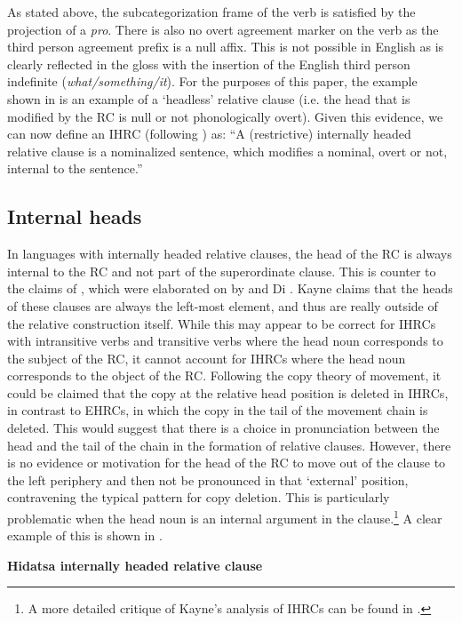 \documentclass[output=paper]{LSP/langsci}
\begin{document}
As stated above, the subcategorization frame of the verb is satisfied by the projection of a \textit{pro}. There is also no overt agreement marker on the verb as the third person agreement prefix is a null affix. This is not possible in English as is clearly reflected in the gloss with the insertion of the English third person indefinite (\textit{what/something/it}). For the purposes of this paper, the example shown in  is an example of a `headless' relative clause (i.e. the head that is modified by the RC is null or not phonologically overt). Given this evidence, we can now define an IHRC (following \citealt[27]{Culy1990}) as: ``A (restrictive) internally headed relative clause is a nominalized sentence, which modifies a nominal, overt or not, internal to the sentence.'' 

\subsection{Internal heads}

In languages with internally headed relative clauses, the head of the RC is always internal to the RC and not part of the superordinate clause. This is counter to the claims of \citet{Kayne1994}, which were elaborated on by \citet{Bianchi1999} and Di \citet{Sciullo2005}. Kayne claims that the heads of these clauses are always the left-most element, and thus are really outside of the relative construction itself.  While this may appear to be correct for IHRCs with intransitive verbs and transitive verbs where the head noun corresponds to the subject of the RC, it cannot account for IHRCs where the head noun corresponds to the object of the RC. Following the copy theory of movement, it could be claimed that the copy at the relative head position is deleted in IHRCs, in contrast to EHRCs, in which the copy in the tail of the movement chain is deleted. This would suggest that there is a choice in pronunciation between the head and the tail of the chain in the formation of relative clauses. However, there is no evidence or motivation for the head of the RC to move out of the clause to the left periphery and then not be pronounced in that `external' position, contravening the typical pattern for copy deletion. This is particularly problematic when the head noun is an internal argument in the clause.\footnote{A more detailed critique of Kayne's analysis of IHRCs can be found in \citet{Boyle2007}.}  A clear example of this is shown in .

\ea \textbf{Hidatsa internally headed relative clause} \label{boyle11}
\end{document}
